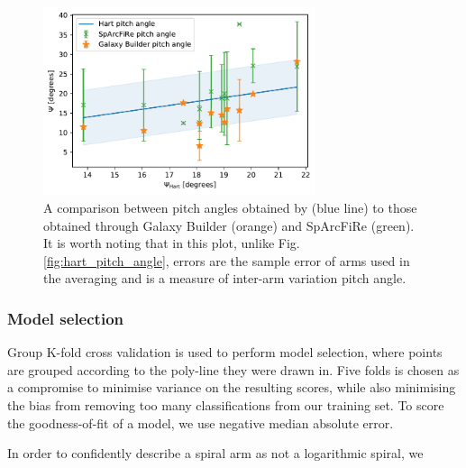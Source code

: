 \documentclass[../main.tex]{subfiles}
\begin{document}
\begin{figure}
  \includegraphics[width=8cm]{images__results/pitch-angle-comparison2.pdf}
  \caption{A comparison between pitch angles obtained by \citet{Hart2016:1607.01019v1} (blue line) to those obtained through Galaxy Builder (orange) and SpArcFiRe (green). It is worth noting that in this plot, unlike Fig.\ref{fig:hart_pitch_angle}, errors are the sample error of arms used in the averaging and is a measure of inter-arm variation pitch angle.}
  \label{fig:sparcfire_pitch_angle}
\end{figure}


\subsubsection{Model selection}


Group K-fold cross validation is used to perform model selection, where points are grouped according to the poly-line they were drawn in. Five folds is chosen as a compromise to minimise variance on the resulting scores, while also minimising the bias from removing too many classifications from our training set. To score the goodness-of-fit of a model, we use negative median absolute error.


In order to confidently describe a spiral arm as not a logarithmic spiral, we 
\end{document}
